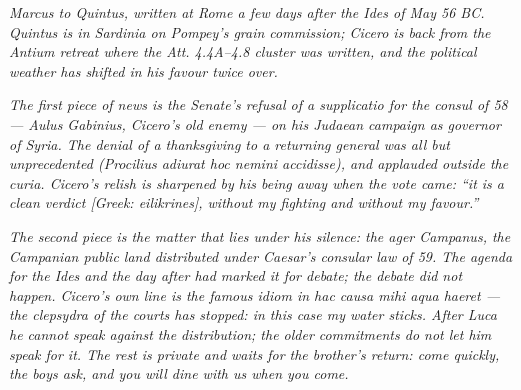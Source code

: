 
\textit{Marcus to Quintus, written at Rome a few days after the
Ides of May 56 BC. Quintus is in Sardinia on Pompey's grain
commission; Cicero is back from the Antium retreat where the
\textit{Att.} 4.4A--4.8 cluster was written, and the political
weather has shifted in his favour twice over.}

\textit{The first piece of news is the Senate's refusal of a
\textit{supplicatio} for the consul of 58 --- Aulus Gabinius,
Cicero's old enemy --- on his Judaean campaign as governor of
Syria. The denial of a thanksgiving to a returning general was
all but unprecedented (\textit{Procilius adiurat hoc nemini
accidisse}), and applauded outside the curia. Cicero's relish
is sharpened by his being away when the vote came: ``it is a
clean verdict \textit{[Greek: eilikrines]}, without my fighting
and without my favour.''}

\textit{The second piece is the matter that lies under his
silence: the \textit{ager Campanus}, the Campanian public land
distributed under Caesar's consular law of 59. The agenda for
the Ides and the day after had marked it for debate; the debate
did not happen. Cicero's own line is the famous idiom
\textit{in hac causa mihi aqua haeret} --- the clepsydra of the
courts has stopped: in this case my water sticks. After Luca
he cannot speak against the distribution; the older commitments
do not let him speak for it. The rest is private and waits for
the brother's return: come quickly, the boys ask, and you will
dine with us when you come.}
